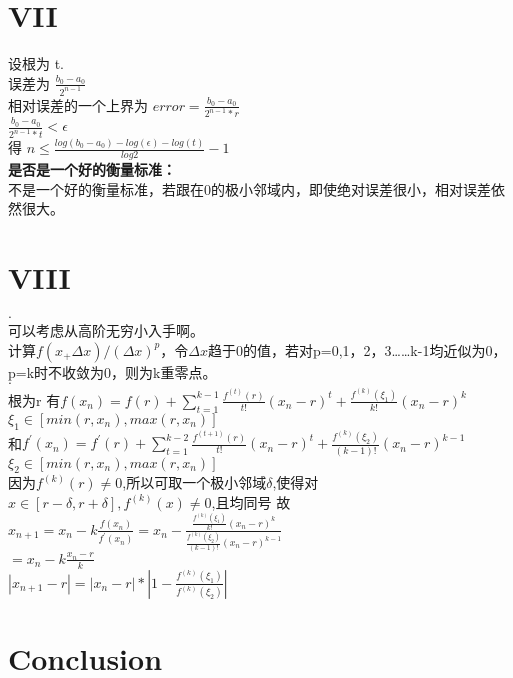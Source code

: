 \documentclass{article}
\begin{document}
\section*{VII}
\begin{flushleft}
  设根为 t.\\
  误差为  $\frac{b_0-a_0}{2^{n-1}}$\\
  相对误差的一个上界为  $error=\frac{b_0-a_0}{2^{n-1}*r}$\\
  $\frac{b_0-a_0}{2^{n-1}*t}<\epsilon$\\
  得    $n \leq \frac{log(b_0-a_0)-log(\epsilon)-log(t)}{log 2}-1$\\
  \textbf{是否是一个好的衡量标准：}\\
  不是一个好的衡量标准，若跟在0的极小邻域内，即使绝对误差很小，相对误差依然很大。
\end{flushleft}

\section*{VIII}
\begin{flushleft}
\textbf{$\cdot$\\}  
  可以考虑从高阶无穷小入手啊。\\
  计算$f(x_+\Delta x)/(\Delta x)^p$，令$\Delta x$趋于0的值，若对p=0,1，2，3……k-1均近似为0，p=k时不收敛为0，则为k重零点。\\

\textbf{$\cdot$\\}  
  根为r
  有$f(x_n)=f(r)+\sum_{t=1}^{k-1}\frac{f^{(t)}(r)}{t!}(x_n-r)^t+\frac{f^{(k)}(\xi_1)}{k!}(x_n-r)^k$\\
  $\xi_1 \in [min(r,x_n),max(r,x_n)]$\\
  和$f^{'}(x_n)=f^{'}(r)+\sum_{t=1}^{k-2}\frac{f^{(t+1)}(r)}{t!}(x_n-r)^t+\frac{f^{(k)}(\xi_2)}{(k-1)!}(x_n-r)^{k-1}$
  $\xi_2 \in [min(r,x_n),max(r,x_n)]$\\
  因为$f^{(k)}(r) \neq 0$,所以可取一个极小邻域$\delta$,使得对$x \in [r-\delta,r+\delta], f^{(k)}(x) \neq 0$,且均同号
  故$x_{n+1}=x_n-k\frac{f(x_n)}{f^{'}(x_n)}=x_n-\frac{\frac{f^{(k)}(\xi_1)}{k!}(x_n-r)^k}{\frac{f^{(k)}(\xi_2)}{(k-1)!}(x_n-r)^{k-1}}$\\
  $=x_n-k\frac{x_n-r}{k}$\\
  $|x_{n+1}-r|=|x_n-r|*|1-\frac{f^{(k)}(\xi_1)}{f^{(k)}(\xi_2)}|$

\end{flushleft}



\section*{Conclusion}
\end{document}
